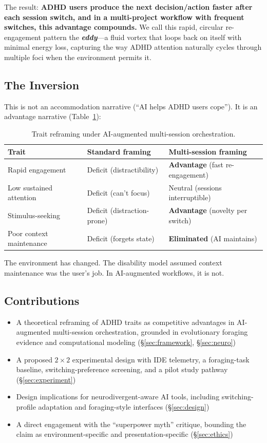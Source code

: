 \documentclass[sigconf,nonacm]{acmart}
\begin{document}
The result: \textbf{ADHD users produce the next decision/action faster after each session switch, and in a multi-project workflow with frequent switches, this advantage compounds.} We call this rapid, circular re-engagement pattern the \textbf{\emph{eddy}}---a fluid vortex that loops back on itself with minimal energy loss, capturing the way ADHD attention naturally cycles through multiple foci when the environment permits it.

\subsection{The Inversion}

This is not an accommodation narrative (``AI helps ADHD users cope''). It is an advantage narrative (Table~\ref{tab:inversion}):

\begin{table}[htbp]
\caption{Trait reframing under AI-augmented multi-session orchestration.}
\label{tab:inversion}
\begin{tabularx}{\columnwidth}{@{}lXX@{}}
\toprule
\textbf{Trait} & \textbf{Standard framing} & \textbf{Multi-session framing} \\
\midrule
Rapid engagement & Deficit (distractibility) & \textbf{Advantage} (fast re-engagement) \\
Low sustained attention & Deficit (can't focus) & Neutral (sessions interruptible) \\
Stimulus-seeking & Deficit (distraction-prone) & \textbf{Advantage} (novelty per switch) \\
Poor context maintenance & Deficit (forgets state) & \textbf{Eliminated} (AI maintains) \\
\bottomrule
\end{tabularx}
\end{table}

The environment has changed. The disability model assumed context maintenance was the user's job. In AI-augmented workflows, it is not.

\subsection{Contributions}

\begin{itemize}
  \item A theoretical reframing of ADHD traits as competitive advantages in AI-augmented multi-session orchestration, grounded in evolutionary foraging evidence and computational modeling (\S\ref{sec:framework}, \S\ref{sec:neuro})
  \item A proposed $2 \times 2$ experimental design with IDE telemetry, a foraging-task baseline, switching-preference screening, and a pilot study pathway (\S\ref{sec:experiment})
  \item Design implications for neurodivergent-aware AI tools, including switching-profile adaptation and foraging-style interfaces (\S\ref{sec:design})
  \item A direct engagement with the ``superpower myth'' critique, bounding the claim as environment-specific and presentation-specific (\S\ref{sec:ethics})
\end{itemize}
\end{document}
